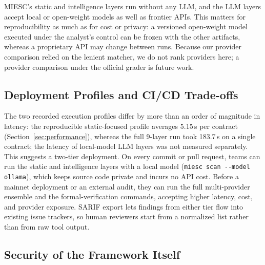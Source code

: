 \documentclass[conference]{IEEEtran}
\begin{document}
MIESC's static and intelligence layers run without any LLM, and the LLM layers accept local or open-weight models as well as frontier APIs. This matters for reproducibility as much as for cost or privacy: a versioned open-weight model executed under the analyst's control can be frozen with the other artifacts, whereas a proprietary API may change between runs. Because our provider comparison relied on the lenient matcher, we do not rank providers here; a provider comparison under the official grader is future work.

\subsection{Deployment Profiles and CI/CD Trade-offs}

The two recorded execution profiles differ by more than an order of magnitude in latency: the reproducible static-focused profile averages 5.15\,s per contract (Section~\ref{sec:performance}), whereas the full 9-layer run took 183.7\,s on a single contract; the latency of local-model LLM layers was not measured separately. This suggests a two-tier deployment. On every commit or pull request, teams can run the static and intelligence layers with a local model (\texttt{miesc scan -{}-model ollama}), which keeps source code private and incurs no API cost. Before a mainnet deployment or an external audit, they can run the full multi-provider ensemble and the formal-verification commands, accepting higher latency, cost, and provider exposure. SARIF export lets findings from either tier flow into existing issue trackers, so human reviewers start from a normalized list rather than from raw tool output.

\subsection{Security of the Framework Itself}
\end{document}
